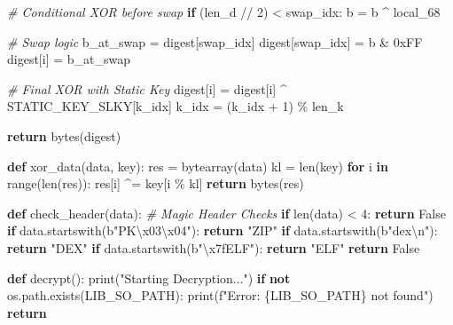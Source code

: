 \documentclass[
]{article}
\newenvironment{Shaded}{}{}
\newcommand{\BaseNTok}[1]{\textcolor[rgb]{0.25,0.63,0.44}{#1}}
\newcommand{\BuiltInTok}[1]{\textcolor[rgb]{0.00,0.50,0.00}{#1}}
\newcommand{\CharTok}[1]{\textcolor[rgb]{0.25,0.44,0.63}{#1}}
\newcommand{\CommentTok}[1]{\textcolor[rgb]{0.38,0.63,0.69}{\textit{#1}}}
\newcommand{\ControlFlowTok}[1]{\textcolor[rgb]{0.00,0.44,0.13}{\textbf{#1}}}
\newcommand{\DecValTok}[1]{\textcolor[rgb]{0.25,0.63,0.44}{#1}}
\newcommand{\KeywordTok}[1]{\textcolor[rgb]{0.00,0.44,0.13}{\textbf{#1}}}
\newcommand{\NormalTok}[1]{#1}
\newcommand{\OperatorTok}[1]{\textcolor[rgb]{0.40,0.40,0.40}{#1}}
\newcommand{\SpecialCharTok}[1]{\textcolor[rgb]{0.25,0.44,0.63}{#1}}
\newcommand{\SpecialStringTok}[1]{\textcolor[rgb]{0.73,0.40,0.53}{#1}}
\newcommand{\StringTok}[1]{\textcolor[rgb]{0.25,0.44,0.63}{#1}}
\newcommand{\VariableTok}[1]{\textcolor[rgb]{0.10,0.09,0.49}{#1}}
\begin{document}
\begin{Shaded}
\begin{Highlighting}[]
        \CommentTok{\# Conditional XOR before swap}
        \ControlFlowTok{if}\NormalTok{ (len\_d }\OperatorTok{//} \DecValTok{2}\NormalTok{) }\OperatorTok{\textless{}}\NormalTok{ swap\_idx:}
\NormalTok{            b }\OperatorTok{=}\NormalTok{ b }\OperatorTok{\^{}}\NormalTok{ local\_68}
            
        \CommentTok{\# Swap logic}
\NormalTok{        b\_at\_swap }\OperatorTok{=}\NormalTok{ digest[swap\_idx]}
\NormalTok{        digest[swap\_idx] }\OperatorTok{=}\NormalTok{ b }\OperatorTok{\&} \BaseNTok{0xFF}
\NormalTok{        digest[i] }\OperatorTok{=}\NormalTok{ b\_at\_swap}
        
        \CommentTok{\# Final XOR with Static Key}
\NormalTok{        digest[i] }\OperatorTok{=}\NormalTok{ digest[i] }\OperatorTok{\^{}}\NormalTok{ STATIC\_KEY\_SLKY[k\_idx]}
\NormalTok{        k\_idx }\OperatorTok{=}\NormalTok{ (k\_idx }\OperatorTok{+} \DecValTok{1}\NormalTok{) }\OperatorTok{\%}\NormalTok{ len\_k}
        
    \ControlFlowTok{return} \BuiltInTok{bytes}\NormalTok{(digest)}

\KeywordTok{def}\NormalTok{ xor\_data(data, key):}
\NormalTok{    res }\OperatorTok{=} \BuiltInTok{bytearray}\NormalTok{(data)}
\NormalTok{    kl }\OperatorTok{=} \BuiltInTok{len}\NormalTok{(key)}
    \ControlFlowTok{for}\NormalTok{ i }\KeywordTok{in} \BuiltInTok{range}\NormalTok{(}\BuiltInTok{len}\NormalTok{(res)):}
\NormalTok{        res[i] }\OperatorTok{\^{}=}\NormalTok{ key[i }\OperatorTok{\%}\NormalTok{ kl]}
    \ControlFlowTok{return} \BuiltInTok{bytes}\NormalTok{(res)}

\KeywordTok{def}\NormalTok{ check\_header(data):}
    \CommentTok{\# Magic Header Checks}
    \ControlFlowTok{if} \BuiltInTok{len}\NormalTok{(data) }\OperatorTok{\textless{}} \DecValTok{4}\NormalTok{: }\ControlFlowTok{return} \VariableTok{False}
    \ControlFlowTok{if}\NormalTok{ data.startswith(}\StringTok{b"PK}\CharTok{\textbackslash{}x03\textbackslash{}x04}\StringTok{"}\NormalTok{): }\ControlFlowTok{return} \StringTok{"ZIP"}
    \ControlFlowTok{if}\NormalTok{ data.startswith(}\StringTok{b"dex}\CharTok{\textbackslash{}n}\StringTok{"}\NormalTok{): }\ControlFlowTok{return} \StringTok{"DEX"}
    \ControlFlowTok{if}\NormalTok{ data.startswith(}\StringTok{b"}\CharTok{\textbackslash{}x7f}\StringTok{ELF"}\NormalTok{): }\ControlFlowTok{return} \StringTok{"ELF"}
    \ControlFlowTok{return} \VariableTok{False}

\KeywordTok{def}\NormalTok{ decrypt():}
    \BuiltInTok{print}\NormalTok{(}\StringTok{"Starting Decryption..."}\NormalTok{)}
    \ControlFlowTok{if} \KeywordTok{not}\NormalTok{ os.path.exists(LIB\_SO\_PATH): }
        \BuiltInTok{print}\NormalTok{(}\SpecialStringTok{f"Error: }\SpecialCharTok{\{}\NormalTok{LIB\_SO\_PATH}\SpecialCharTok{\}}\SpecialStringTok{ not found"}\NormalTok{)}
        \ControlFlowTok{return}
        

\end{Highlighting}
\end{Shaded}
\end{document}
